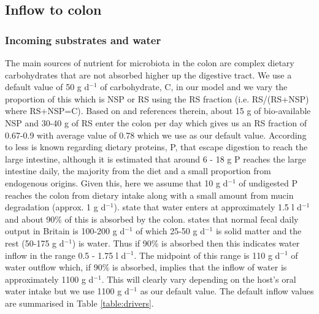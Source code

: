 \documentclass[a4paper]{article}
\begin{document}

\subsection*{Inflow to colon}
\subsubsection*{Incoming substrates and water}
The main sources of nutrient for microbiota in the colon are complex dietary carbohydrates that are not absorbed higher up the digestive tract. 
We use a default value of 50 g d$^{-1}$ of carbohydrate, C, in our model and we vary the proportion of this which is NSP or RS using the RS fraction (i.e. RS/(RS+NSP) where RS+NSP=C). 
Based on \cite{Cremer17} and references therein, about 15 g of bio-available NSP and 30-40 g of RS enter the colon per day which gives us an RS fraction of 0.67-0.9 with average value of 0.78 which we use as our default value.
According to \cite{yao} less is known regarding dietary proteins, P, that escape digestion to reach the large intestine, although it is estimated that around 6 - 18 g P reaches the large intestine daily, the majority from the diet and a small proportion from endogenous origins.
Given this, here we assume that 10 g d$^{-1}$ of undigested P reaches the colon from dietary intake along with a small amount from mucin degradation (approx. 1  g d$^{-1}$).
\cite{Phillips} state that water enters at approximately 1.5 l d$^{-1}$  and about 90\% of this is absorbed by the colon.
\cite{StephenCummings} states that normal fecal daily output in Britain is 100-200 g d$^{-1}$ of which 25-50 g d$^{-1}$ is solid matter and the rest (50-175 g d$^{-1}$) is water. Thus if 90\% is absorbed then this indicates water inflow in the range 0.5 - 1.75 l d$^{-1}$. 
The midpoint of this range is 110 g d$^{-1}$ of water outflow which, if 90\% is absorbed, implies that the inflow of water is approximately 1100 g d$^{-1}$. This will clearly vary depending on the host's oral water intake but we use 1100 g d$^{-1}$ as our default value.
The default inflow values are summarised in Table \ref{table:drivers}.
\end{document}
